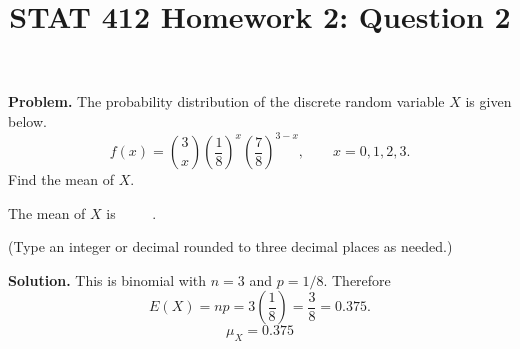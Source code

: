 \documentclass[11pt]{article}
\title{STAT 412 Homework 2: Question 2}
\author{}
\date{}
\begin{document}
\maketitle
\textbf{Problem.} The probability distribution of the discrete random variable
\(X\) is given below.
\[
f(x)=\binom{3}{x}\left(\frac18\right)^x
\left(\frac78\right)^{3-x},\qquad x=0,1,2,3.
\]
Find the mean of \(X\).

The mean of \(X\) is \(\boxed{\phantom{0.000}}\).

(Type an integer or decimal rounded to three decimal places as needed.)

\textbf{Solution.} This is binomial with \(n=3\) and \(p=1/8\). Therefore
\[
E(X)=np=3\left(\frac18\right)=\frac38=0.375.
\]
\[
\boxed{\mu_X=0.375}
\]
\end{document}
